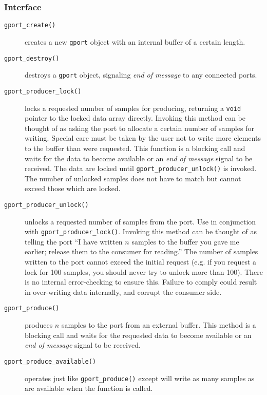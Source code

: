 \subsubsection{Interface}
\label{module:buffer:gport:interface}

\begin{description}
\item[{\tt gport\_create()}]
    creates a new {\tt gport} object with an internal buffer of a certain
    length.
\item[{\tt gport\_destroy()}]
    destroys a {\tt gport} object, signaling {\it end of message} to any
    connected ports.
\item[{\tt gport\_producer\_lock()}]
    locks a requested number of samples for producing, returning a {\tt void}
    pointer to the locked data array directly.
    Invoking this method can be thought of as asking the port to allocate a
    certain number of samples for writing.
    Special care must be taken by the user not to write more elements to the
    buffer than were requested.
    This function is a blocking call and waits for the data to become
    available or an {\it end of message} signal to be received.
    The data are locked until {\tt gport\_producer\_unlock()} is invoked.
    The number of unlocked samples does not have to match but cannot exceed
    those which are locked.
\item[{\tt gport\_producer\_unlock()}]
    unlocks a requested number of samples from the port.
    Use in conjunction with {\tt gport\_producer\_lock()}.
    Invoking this method can be thought of as telling the port ``I have
    written $n$ samples to the buffer you gave me earlier; release them to the
    consumer for reading.''
    The number of samples written to the port cannot exceed the initial
    request (e.g. if you request a lock for 100 samples, you should never try
    to unlock more than 100).
    There is no internal error-checking to ensure this.
    Failure to comply could result in over-writing data internally, and
    corrupt the consumer side.
\item[{\tt gport\_produce()}]
    produces $n$ samples to the port from an external buffer.
    This method is a blocking call and waits for the requested data to become
    available or an {\it end of message} signal to be received.
\item[{\tt gport\_produce\_available()}]
    operates just like {\tt gport\_produce()} except will write as many
    samples as are available when the function is called.

\end{description}
